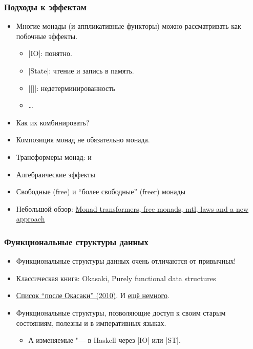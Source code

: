 \documentclass[11pt]{beamer}
\begin{document}
\begin{frame}[fragile]
  \frametitle{Подходы к эффектам}
  \begin{itemize}
    \item Многие монады (и аппликативные функторы) можно рассматривать как побочные эффекты.
          \begin{itemize}
            \item \haskinline|IO|: понятно.
            \item \haskinline|State|: чтение и запись в память.
            \item \haskinline|[]|: недетерминированность
            \item \ldots
          \end{itemize}
          \pause
    \item Как их комбинировать?
    \item Композиция монад не обязательно монада.
          \pause
    \item Трансформеры монад:  и 
    \item Алгебраические эффекты
    \item Свободные (free) и \enquote{более свободные} (freer) монады
    \item Небольшой обзор: \href{https://ocharles.org.uk/posts/2016-01-26-transformers-free-monads-mtl-laws.html}{Monad transformers, free monads, mtl, laws and a new approach}
  \end{itemize}
\end{frame}

\begin{frame}[fragile]
  \frametitle{Функциональные структуры данных}
  \begin{itemize}
    \item Функциональные структуры данных очень отличаются от привычных!
    \item Классическая книга: Okasaki, Purely functional data structures
    \item \href{https://cstheory.stackexchange.com/questions/1539/whats-new-in-purely-functional-data-structures-since-okasaki}{Список \enquote{после Окасаки} (2010)}. И \href{https://www.reddit.com/r/haskell/comments/a4wk1i/seminal_works_after_purely_functional_data/ebm30ra/}{ещё немного}.
          \pause
    \item Функциональные структуры, позволяющие доступ к своим старым состояниям, полезны и в императивных языках.
          \begin{itemize}
            \item А изменяемые "--- в Haskell через \haskinline|IO| или \haskinline|ST|.
          \end{itemize}
  \end{itemize}
\end{frame}
\end{document}
